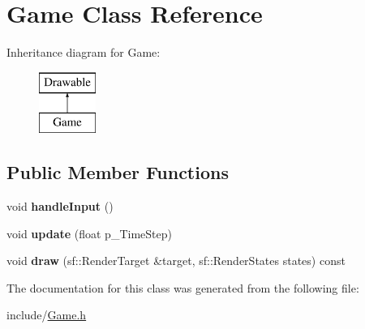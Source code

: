 \hypertarget{class_game}{}\section{Game Class Reference}
\label{class_game}
Inheritance diagram for Game\+:\begin{figure}[H]
\begin{center}
\leavevmode
\includegraphics[height=2.000000cm]{class_game}
\end{center}
\end{figure}
\subsection*{Public Member Functions}
\begin{DoxyCompactItemize}
\item 
\mbox{\label{class_game_aa5abc4e07a1f5abce24e473c5567300b}} 
void {\bfseries handle\+Input} ()
\item 
\mbox{\label{class_game_a3fd12339411955db6a5445ba213ef293}} 
void {\bfseries update} (float p\+\_\+\+Time\+Step)
\item 
\mbox{\label{class_game_a143d1a2f8a527db60f1fe47ab3d854a7}} 
void {\bfseries draw} (sf\+::\+Render\+Target \&target, sf\+::\+Render\+States states) const
\end{DoxyCompactItemize}


The documentation for this class was generated from the following file\+:\begin{DoxyCompactItemize}
\item 
include/\hyperlink{_game_8h}{Game.\+h}\end{DoxyCompactItemize}
